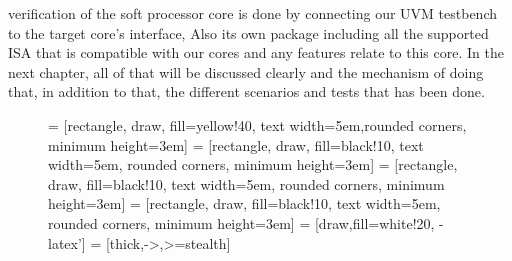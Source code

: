 \documentclass[conference,10 pt,twoside]{IEEEtran}
\begin{document}
verification of the soft processor core is done by connecting our UVM testbench to the target core's interface, Also its own package including all the supported ISA that is compatible with our cores and any features relate to this core. In the next chapter, all of that will be discussed clearly and the mechanism of doing that, in addition to that, the different scenarios and tests that has been done.\par
\begin{center}
\begin{figure}[h]
\centering
{} = [rectangle, draw, fill=yellow!40, text width=5em,rounded corners, minimum height=3em]
 = [rectangle, draw, fill=black!10, text width=5em, rounded corners, minimum height=3em]
 = [rectangle, draw, fill=black!10, text width=5em, rounded corners, minimum height=3em]
 = [rectangle, draw, fill=black!10, text width=5em, rounded corners, minimum height=3em]
 = [draw,fill=white!20, -latex']
 = [thick,->,>=stealth]

\end{figure}
\end{center}
\end{document}
